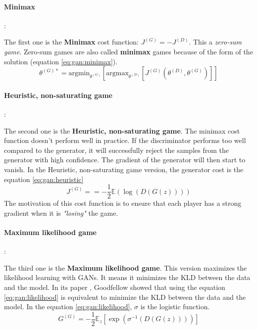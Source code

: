 \documentclass[12pt]{report}
\begin{document}
\paragraph{Minimax}:

The first one is the \textbf{Minimax} cost function: $J^{(G)} = - J^{(D)}$.
This a \textit{zero-sum game}.
Zero-sum games are also called \textbf{minimax} games because of the form of the solution (equation \ref{eq:gan:minimax}).
\begin{equation}
    \theta^{(G)*} = \text{argmin}_{\theta^{(G)}} \left[ \text{argmax}_{\theta^{(D)}} \left[ J^{(G)} \left( \theta^{(D)}, \theta^{(G)} \right) \right] \right]
    \label{eq:gan:minimax}
\end{equation}

\paragraph{Heuristic, non-saturating game}:

The second one is the \textbf{Heuristic, non-saturating game}.
The minimax cost function doesn't perform well in practice.
If the discriminator performs too well compared to the generator, it will successfully reject the samples from the generator with high confidence.
The gradient of the generator will then start to vanish.
In the Heuristic, non-saturating game version, the generator cost is the equation \ref{eq:gan:heuristic}
\begin{equation}
    J^{(G)} = = - \frac{1}{2} \mathbb{E} (\log(D(G(z))))
    \label{eq:gan:heuristic}
\end{equation}
The motivation of this cost function is to ensure that each player has a strong gradient when it is \textit{"losing"} the game.

\paragraph{Maximum likelihood game}:

The third one is the \textbf{Maximum likelihood game}.
This version maximizes the likelihood learning with GANs.
It means it minimizes the KLD between the data and the model.
In its paper \cite{goodfellow_generative_2014}, Goodfellow showed that using the equation \ref{eq:gan:likelihood} is equivalent to minimize the KLD between the data and the model.
In the equation \ref{eq:gan:likelihood}, $\sigma$ is the logistic function.
\begin{equation}
    G^{(G)} = - \frac{1}{2} \mathbb{E}_{z} \left[ \exp \left( \sigma^{-1} (D(G(z))) \right) \right]
    \label{eq:gan:likelihood}
\end{equation}
\end{document}
